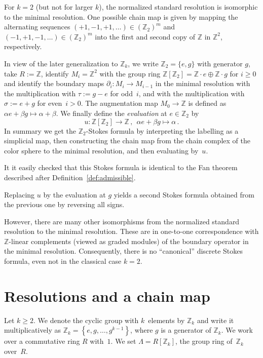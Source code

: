 \documentclass[11pt,a4paper,draft]{article}
\newcommand{\Z}{{\mathbb Z}}
\newcommand\set[1]{\left\{#1\right\}}
\theoremstyle{definition}
\begin{document}
For $k=2$ (but not for larger $k$), the normalized standard resolution is isomorphic
to the minimal resolution. One possible chain map is given by
mapping the alternating sequences
$(+1,-1,+1,\dots)\in(\Z_2)^m$ and $(-1,+1,-1,\dots)\in(\Z_2)^m$
into the first and second copy of $\Z$ in $\Z^2$, respectively.


In view of the later generalization to $\Z_k$, we write $\Z_2=\{e,g\}$ with generator $g$, take $R:=\Z$,
identify $M_i=\Z^2$ with the group ring $\Z[\Z_2]=\Z \cdot e \oplus \Z \cdot g$ for $i\ge0$  
and identify the boundary maps $\partial_i: M_i \to M_{i-1}$ in the minimal resolution with
the multiplication with $\tau:=g-e$ for odd~$i$, and with
the multiplication with $\sigma:=e+g$ for even~$i > 0$.
The augmentation map $M_0 \rightarrow \Z$ is defined as
$\alpha e +  \beta g \mapsto \alpha+\beta$.
We finally define the \emph{evaluation}  at $e \in \Z_2$ by
\[
   u : \Z[\Z_2] \rightarrow \Z  \, , ~~  \alpha e + \beta g \mapsto \alpha \, . 
\]
In summary we get the $\Z_2$-Stokes formula
by interpreting the labelling as a simplicial map, then constructing
the chain map from the chain complex of the color sphere to the
minimal resolution, and then evaluating by~$u$.

It it easily checked that this Stokes formula is identical to
the Fan theorem described after Definition~\ref{def:admissible}.

Replacing $u$ by the evaluation at $g$ yields a second Stokes formula obtained from the previous one
by reversing all signs.

However, there are many other isomorphisms from  the
normalized standard resolution to the minimal resolution. These are in one-to-one
correspondence with $\Z$-linear complements (viewed as graded modules)
of the boundary operator in the minimal resolution.
Consequently, there is no ``canonical'' discrete
Stokes formula, even not in the classical case $k=2$.  





\section{Resolutions and a chain map}
\label{sec:chain_map}

Let $k\ge2$.  We denote the cyclic group with $k$~elements by $\Z_k$ and write
it multiplicatively as $\Z_k=\set{e,g,\dots,g^{k-1}}$, where $g$ is a
generator of $\Z_k$.  We work over a commutative ring $R$ with~$1$.
We set $\Lambda=R[\Z_k]$, the group ring of~$\Z_k$ over~$R$.
\end{document}
